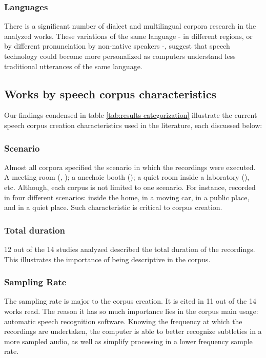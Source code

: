 \subsubsection{Languages}

There is a significant number of dialect and multilingual corpora research in the analyzed works. These variations of the same language - in different regions, or by different pronunciation by non-native speakers -, suggest that speech technology could become more personalized as computers understand less traditional utterances of the same language.

\subsection{Works by speech corpus characteristics}

Our findings condensed in table \ref{tab:results-categorization} illustrate the
current speech corpus creation characteristics used in the literature, each discussed below:

\subsubsection{Scenario}

Almost all corpora specified the scenario in which the recordings were executed. A meeting room (\cite{liu2016sheffield}, \cite{moore2017sheffield}); a anechoic booth (\cite{goldman2016siwis}); a quiet room inside a laboratory (\cite{ramli2017first}), etc. Although, each corpus is not limited to one scenario. For instance, \cite{almeman2018building} recorded in four different scenarios: inside the home, in a moving car, in a public place, and in a quiet place. Such characteristic is critical to corpus creation.

\subsubsection{Total duration}

12 out of the 14 studies analyzed described the total duration of the recordings. This illustrates the importance of being descriptive in the corpus.

\subsubsection{Sampling Rate}

The sampling rate is major to the corpus creation. It is cited in 11 out of the 14 works read. The reason it has so much importance lies in the corpus main usage: automatic speech recognition software. Knowing the frequency at which the recordings are undertaken, the computer is able to better recognize subtleties in a more sampled audio, as well as simplify processing in a lower frequency sample rate.

